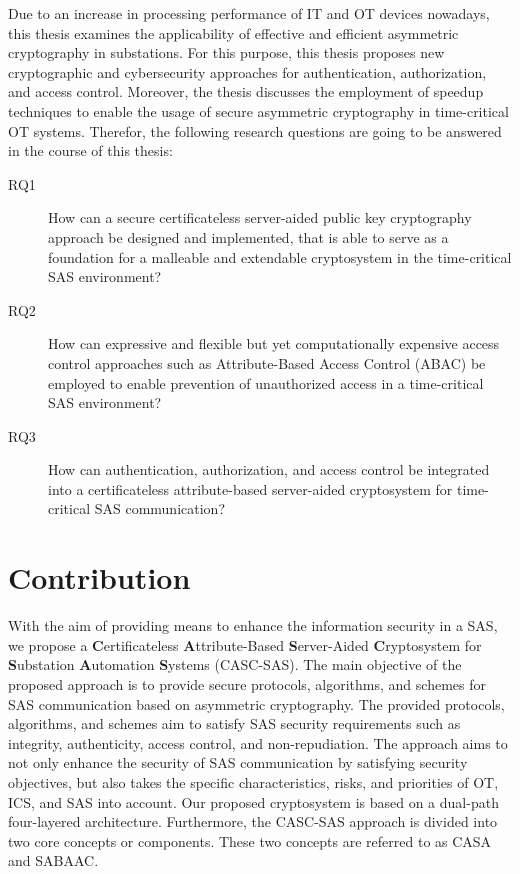 Due to an increase in processing performance of IT and OT devices nowadays, this thesis examines the applicability of effective and efficient asymmetric cryptography in substations.
For this purpose, this thesis proposes new cryptographic and cybersecurity approaches for authentication, authorization, and access control.
Moreover, the thesis discusses the employment of speedup techniques to enable the usage of secure asymmetric cryptography in time-critical OT systems.
Therefor, the following research questions are going to be answered in the course of this thesis:
\begin{description}
    \item[RQ1] How can a secure certificateless server-aided public key cryptography approach be designed and implemented, that is able to serve as a foundation for a malleable and extendable cryptosystem in the time-critical SAS environment?
    \item[RQ2] How can expressive and flexible but yet computationally expensive access control approaches such as Attribute-Based Access Control (ABAC) be employed to enable prevention of unauthorized access in a time-critical SAS environment?
    \item[RQ3] How can authentication, authorization, and access control be integrated into a certificateless attribute-based server-aided cryptosystem for time-critical SAS communication?
\end{description}

\section{Contribution}
\label{sec:introduction:contribution}
With the aim of providing means to enhance the information security in a SAS, we propose a \textbf{C}ertificateless \textbf{A}ttribute-Based \textbf{S}erver-Aided \textbf{C}ryptosystem for \textbf{S}ubstation \textbf{A}utomation \textbf{S}ystems (CASC-SAS).
The main objective of the proposed approach is to provide secure protocols, algorithms, and schemes for SAS communication based on asymmetric cryptography.
The provided protocols, algorithms, and schemes aim to satisfy SAS security requirements such as integrity, authenticity, access control, and non-repudiation.
The approach aims to not only enhance the security of SAS communication by satisfying security objectives, but also takes the specific characteristics, risks, and priorities of OT, ICS, and SAS into account.
Our proposed cryptosystem is based on a dual-path four-layered architecture.
Furthermore, the CASC-SAS approach is divided into two core concepts or components.
These two concepts are referred to as CASA and SABAAC.

